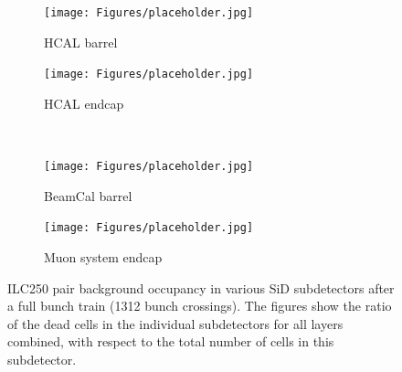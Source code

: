   \begin{figure}[htb]\ContinuedFloat
     \begin{subfigure}[b]{0.49\textwidth}
   \centering
    \texttt{[image: Figures/placeholder.jpg]}
   \caption{\sid HCAL barrel}
   \end{subfigure}
   \hfill
    \begin{subfigure}[b]{0.49\textwidth}
   \centering
    \texttt{[image: Figures/placeholder.jpg]}
   \caption{\sid HCAL endcap}
   \end{subfigure}\\
     \begin{subfigure}[b]{0.49\textwidth}
   \centering
    \texttt{[image: Figures/placeholder.jpg]}
   \caption{\sid BeamCal barrel}
   \end{subfigure}
   \hfill
    \begin{subfigure}[b]{0.49\textwidth}
   \centering
    \texttt{[image: Figures/placeholder.jpg]}
   \caption{\sid Muon system endcap}
   \end{subfigure}
   \caption[Pair background occupancy in various \sid subdetectors for the ILC250]{ILC250 pair background occupancy in various SiD subdetectors after a full bunch train (1312 bunch crossings).
   The figures show the ratio of the dead cells in the individual subdetectors for all layers combined, with respect to the total number of cells in this subdetector.
   }
   \label{fig:PairBkg:ILC250_Occupancy_Further_detectors}
 \end{figure}

